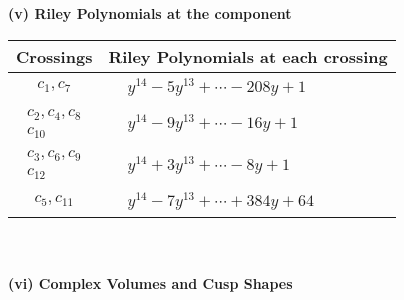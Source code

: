 \documentclass[1p]{elsarticle_modified}
\theoremstyle{definition}
\begin{document}
\newpage\renewcommand{\arraystretch}{1}
\flushleft \textbf{(v) Riley Polynomials at the component}\newline \\
\begin{tabular}{m{50pt}|m{274pt}}
Crossings & \hspace{64pt}Riley Polynomials at each crossing \\
\hline $$\begin{aligned}c_{1},c_{7}\end{aligned}$$&$\begin{aligned}
&y^{14}-5 y^{13}+\cdots-208 y+1
\end{aligned}$\\
\hline $$\begin{aligned}c_{2},c_{4},c_{8}\\c_{10}\end{aligned}$$&$\begin{aligned}
&y^{14}-9 y^{13}+\cdots-16 y+1
\end{aligned}$\\
\hline $$\begin{aligned}c_{3},c_{6},c_{9}\\c_{12}\end{aligned}$$&$\begin{aligned}
&y^{14}+3 y^{13}+\cdots-8 y+1
\end{aligned}$\\
\hline $$\begin{aligned}c_{5},c_{11}\end{aligned}$$&$\begin{aligned}
&y^{14}-7 y^{13}+\cdots+384 y+64
\end{aligned}$\\
\hline
\end{tabular}\\~\\
\newpage\flushleft \textbf{(vi) Complex Volumes and Cusp Shapes}
\end{document}
